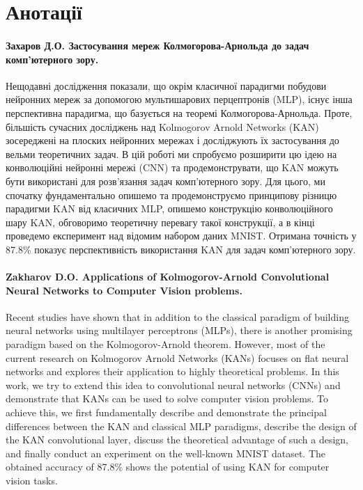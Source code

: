 \chapter*{Анотації}

\subsubsection{Захаров Д.О. Застосування мереж Колмогорова-Арнольда до задач комп'ютерного зору.}

Нещодавні дослідження показали, що окрім класичної парадигми побудови нейронних
мереж за допомогою мультишарових перцептронів (MLP), існує інша перспективна
парадигма, що базується на теоремі Колмогорова-Арнольда. Проте, більшість
сучасних досліджень над Kolmogorov Arnold Networks (KAN) зосереджені на плоских
нейронних мережах і досліджують їх застосування до вельми теоретичних задач. В
цій роботі ми спробуємо розширити цю ідею на конволюційні нейронні мережі (CNN)
та продемонструвати, що KAN можуть бути використані для розв'язання задач
комп'ютерного зору. Для цього, ми спочатку фундаментально опишемо та 
продемонструємо принципову різницю парадигми KAN від класичних MLP, 
опишемо конструкцію конволюційного шару KAN, обговоримо теоретичну 
перевагу такої конструкції, а в кінці проведемо експеримент над 
відомим набором даних MNIST. Отримана точність у 87.8\% показує
перспективність використання KAN для задач комп'ютерного зору.


\subsubsection{Zakharov D.O. Applications of Kolmogorov-Arnold Convolutional Neural Networks to Computer Vision problems.}

Recent studies have shown that in addition to the classical paradigm of building
neural networks using multilayer perceptrons (MLPs), there is another promising
paradigm based on the Kolmogorov-Arnold theorem. However, most of the current
research on Kolmogorov Arnold Networks (KANs) focuses on flat neural networks
and explores their application to highly theoretical problems. In this work, we
try to extend this idea to convolutional neural networks (CNNs) and demonstrate
that KANs can be used to solve computer vision problems. To achieve this, we
first fundamentally describe and demonstrate the principal differences between
the KAN and classical MLP paradigms, describe the design of the KAN
convolutional layer, discuss the theoretical advantage of such a design, and
finally conduct an experiment on the well-known MNIST dataset. The obtained
accuracy of 87.8\% shows the potential of using KAN for computer vision tasks.

